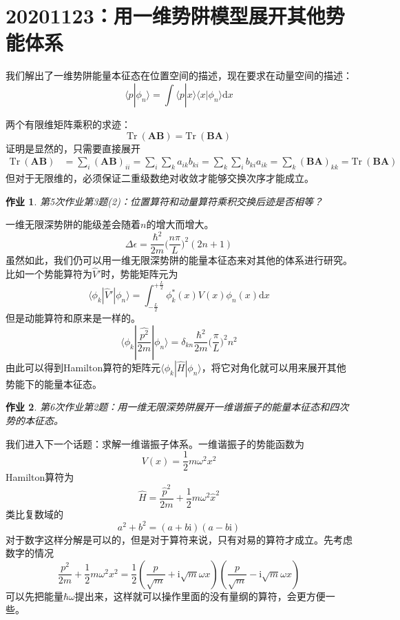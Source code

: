 \documentclass[12pt]{article}
\newtheorem{asg}{作业}
\begin{document}
\section{20201123：用一维势阱模型展开其他势能体系}

    我们解出了一维势阱能量本征态在位置空间的描述，现在要求在动量空间的描述：
    \[ \langle p|\phi_n \rangle = \int \langle p|x \rangle \langle x |\phi_n \rangle \mathrm{d}x \]

    两个有限维矩阵乘积的求迹：
    \begin{equation*}
        \mathrm{Tr} \ (\bm{AB}) = \mathrm{Tr} \ (\bm{BA})
    \end{equation*}
    证明是显然的，只需要直接展开
    \begin{align*}
        \mathrm{Tr} \ (\bm{AB}) &= \sum_i (\bm{AB})_{ii}
        = \sum_i \sum_k a_{ik}b_{ki}
        = \sum_k \sum_i b_{ki}a_{ik}
        = \sum_k \bm{(BA)}_{kk}
        = \mathrm{Tr} \ (\bm{BA})
    \end{align*}
    但对于无限维的，必须保证二重级数绝对收敛才能够交换次序才能成立。
    \begin{asg}
        第5次作业第3题(2)：位置算符和动量算符乘积交换后迹是否相等？
    \end{asg}

    一维无限深势阱的能级差会随着$n$的增大而增大。
    \[ \Delta \epsilon = \frac {\hbar^2}{2m} \bigg(\frac {n\pi}L \bigg)^2 (2n+1) \]
    虽然如此，我们仍可以用一维无限深势阱的能量本征态来对其他的体系进行研究。比如一个势能算符为$\hat{V}'$时，势能矩阵元为
    \[
        \langle \phi_k | \hat{V}' | \phi_n \rangle = \int_{-\frac L2}^{+\frac L2} \phi_k^*(x) V(x) \phi_n(x) \mathrm{d}x 
    \]
    但是动能算符和原来是一样的。
    \[
        \langle \phi_k | \frac {\hat{p^2}}{2m} | \phi_n \rangle = \delta_{kn} \frac {\hbar^2}{2m} \bigg( \frac {\pi}L \bigg)^2 n^2
    \]
    由此可以得到Hamilton算符的矩阵元$\langle \phi_k | \hat{H} | \phi_n \rangle$，将它对角化就可以用来展开其他势能下的能量本征态。
    \begin{asg}
        第6次作业第2题：用一维无限深势阱展开一维谐振子的能量本征态和四次势的本征态。
    \end{asg}

    我们进入下一个话题：求解一维谐振子体系。一维谐振子的势能函数为
    \[ V(x) = \frac 12 m\omega^2x^2 \]
    Hamilton算符为
    \[ \hat{H} = \frac {\hat{p}^2}{2m} + \frac 12 m\omega^2 \hat{x}^2 \]
    类比复数域的
    \[ a^2 + b^2 = (a+b\mathrm{i})(a-b\mathrm{i}) \]
    对于数字这样分解是可以的，但是对于算符来说，只有对易的算符才成立。先考虑数字的情况
    \[ \frac {p^2}{2m} + \frac 12 m\omega^2 x^2 = \frac 12 (\frac p{\sqrt{m}} + \mathrm{i}\sqrt{m}\omega x)(\frac p{\sqrt{m}} - \mathrm{i}\sqrt{m}\omega x) \]
    可以先把能量$\hbar \omega$提出来，这样就可以操作里面的没有量纲的算符，会更方便一些。
\end{document}
